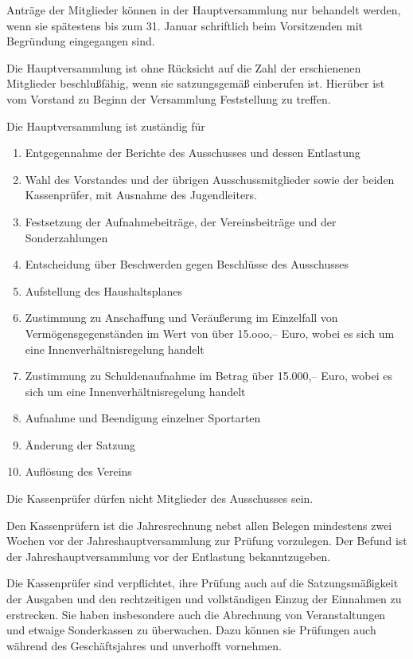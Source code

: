 \documentclass[11pt,a4paper,parskip=half]{scrartcl}
\begin{document}
\begin{contract}
\begin{multicols}{2}
    Anträge der Mitglieder können in der Hauptversammlung nur behandelt werden,
    wenn sie spätestens bis zum 31. Januar schriftlich beim Vorsitzenden mit Begründung eingegangen sind.

    Die Hauptversammlung ist ohne Rücksicht auf die Zahl der erschienenen Mitglieder beschlußfähig,
    wenn sie satzungsgemäß einberufen ist.
    Hierüber ist vom Vorstand zu Beginn der Versammlung Feststellung zu treffen.

    Die Hauptversammlung ist zuständig für
    \begin{enumerate}[label=\alph*)]
      \item Entgegennahme der Berichte des Ausschusses und dessen Entlastung
      \item Wahl des Vorstandes und der übrigen Ausschussmitglieder sowie der beiden Kassenprüfer,
      mit Ausnahme des Jugendleiters.
      \item Festsetzung der Aufnahmebeiträge,
      der Vereinsbeiträge und der Sonderzahlungen
      \item Entscheidung über Beschwerden gegen Beschlüsse des Ausschusses
      \item Aufstellung des Haushaltsplanes
      \item Zustimmung zu Anschaffung und Veräußerung im Einzelfall von Vermögensgegenständen im Wert von über 15.ooo,-- Euro,
      wobei es sich um eine Innenverhältnisregelung handelt
      \item Zustimmung zu Schuldenaufnahme im Betrag über 15.000,-- Euro,
      wobei es sich um eine Innenverhältnisregelung handelt
      \item Aufnahme und Beendigung einzelner Sportarten
      \item Änderung der Satzung
      \item Auflösung des Vereins
    \end{enumerate}

    Die Kassenprüfer dürfen nicht Mitglieder des Ausschusses sein.

    Den Kassenprüfern ist die Jahresrechnung nebst allen Belegen mindestens zwei Wochen vor der Jahreshauptversammlung zur Prüfung vorzulegen. 
    Der Befund ist der Jahreshauptversammlung vor der Entlastung bekanntzugeben.

    Die Kassenprüfer sind verpflichtet,
    ihre Prüfung auch auf die Satzungsmäßigkeit der Ausgaben und den rechtzeitigen und vollständigen Einzug der Einnahmen zu erstrecken.
    Sie haben insbesondere auch die Abrechnung von Veranstaltungen und etwaige Sonderkassen zu überwachen.
    Dazu können sie Prüfungen auch während des Geschäftsjahres und unverhofft vornehmen.


\end{multicols}
\end{contract}
\end{document}
